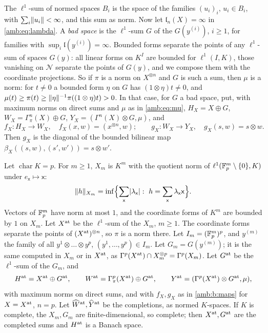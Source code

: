 \begin{definition}
The $\ell^1$-sum of normed spaces $B_i$ is the space of the families $(u_i)_i$, $u_i\in B_i$, with $\sum_i\lVert u_i\rVert<\infty$, and this sum as norm. Now let $\mathfrak l_n(X)=\infty$ in \eqref{amb:eq:lambda}. A \emph{bad space} is the $\ell^1$-sum $G$ of the $G(y^{(i)})$, $i\ge1$, for families with $\sup_i\mathfrak l(y^{(i)})=\infty$. Bounded forms separate the points of any $\ell^1$-sum of spaces $G(y)$: all linear forms on $K^I$ are bounded for $\ell^1(I,K)$, those vanishing on $\mathcal N$ separate the points of $G(y)$, and we compose them with the coordinate projections. So if $\pi$ is a norm on $X^{\otimes n}$ and $G$ is such a sum, then $\mu$ is a norm: for $t\ne0$ a bounded form $\eta$ on $G$ has $(1\otimes\eta)t\ne0$, and $\mu(t)\ge\pi(t)\ge\lVert \eta\rVert^{-1}\pi((1\otimes\eta)t)>0$. In that case, for $G$ a bad space, put, with maximum norms on direct sums and $\mu$ as in \eqref{amb:eq:mu}, $H_X=X\oplus G$, $W_X=\Gamma^n_\pi(X)\oplus G$, $Y_X=(\Gamma^n(X)\otimes G,\mu)$, and
\begin{equation}\label{amb:b:maps}
 f_X\colon H_X\to W_X,\quad f_X(x,w)=(x^{\otimes n},w);\qquad
 g_X\colon W_X\to Y_X,\quad g_X(s,w)=s\otimes w.
\end{equation}
Then $g_X$ is the diagonal of the bounded bilinear map $\beta_X((s,w),(s',w'))=s\otimes w'$.
\end{definition}

\begin{definition}\label{amb:def:atomic}
Let $\operatorname{char}K=p$. For $m\ge1$, $X_m$ is $K^m$ with the quotient norm of $\ell^1(\mathbb F_p^m\setminus\{0\},K)$ under $e_{\mathsf x}\mapsto\mathsf x$:
\[
 \lVert h\rVert_{X_m}=\inf\Bigl\{\sum_{\mathsf x}\lvert \lambda_{\mathsf x}\rvert:\ h=\sum_{\mathsf x}\lambda_{\mathsf x}\mathsf x\Bigr\}.
\]
Vectors of $\mathbb F_p^m$ have norm at most $1$, and the coordinate forms of $K^m$ are bounded by $1$ on $X_m$. Let $X^{\rm at}$ be the $\ell^1$-sum of the $X_m$, $m\ge1$. The coordinate forms separate the points of $(X^{\rm at})^{\otimes n}$, so $\pi$ is a norm there. Let $I_m=(\mathbb F_p^m)^p$, and $y^{(m)}$ the family of all $y^1\otimes\dots\otimes y^p$, $(y^1,\dots,y^p)\in I_m$. Let $G_m=G(y^{(m)})$; it is the same computed in $X_m$ or in $X^{\rm at}$, as $\Gamma^p(X^{\rm at})\cap X_m^{\otimes p}=\Gamma^p(X_m)$. Let $G^{\rm at}$ be the $\ell^1$-sum of the $G_m$, and
\[
 H^{\rm at}=X^{\rm at}\oplus G^{\rm at},\qquad
 W^{\rm at}=\Gamma^p_\pi(X^{\rm at})\oplus G^{\rm at},\qquad
 Y^{\rm at}=(\Gamma^p(X^{\rm at})\otimes G^{\rm at},\mu),
\]
with maximum norms on direct sums, and with $f_X,g_X$ as in \eqref{amb:b:maps} for $X=X^{\rm at}$, $n=p$. Let $\widehat W^{\rm at},\widehat Y^{\rm at}$ be the completions, as normed $K$-spaces. If $K$ is complete, the $X_m,G_m$ are finite-dimensional, so complete; then $X^{\rm at},G^{\rm at}$ are the completed sums and $H^{\rm at}$ is a Banach space.
\end{definition}

